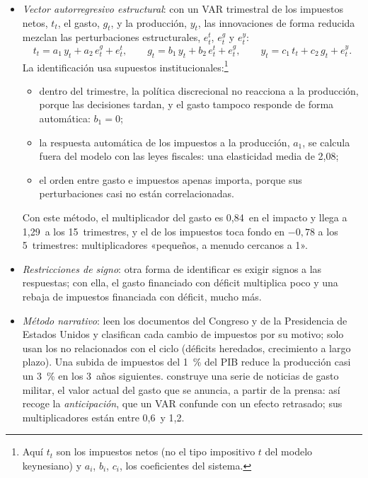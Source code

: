 \documentclass[11pt]{article}
\begin{document}
\begin{itemize}
\item \emph{Vector autorregresivo estructural}\nocite{BlanchardPerotti2002}: con un VAR trimestral de los impuestos netos, $t_t$, el gasto, $g_t$, y la producción, $y_t$, las innovaciones de forma reducida mezclan las perturbaciones estructurales, $e^t_t$, $e^g_t$ y $e^y_t$:
  \begin{equation*}
  t_t=a_1\,y_t+a_2\,e^g_t+e^t_t,\qquad g_t=b_1\,y_t+b_2\,e^t_t+e^g_t,\qquad y_t=c_1\,t_t+c_2\,g_t+e^y_t .
  \end{equation*}
  La identificación usa supuestos institucionales:\footnote{Aquí $t_t$ son los impuestos netos (no el tipo impositivo $t$ del modelo keynesiano) y $a_i$, $b_i$, $c_i$, los coeficientes del sistema.}
  \begin{itemize}
  \item dentro del trimestre, la política discrecional no reacciona a la producción, porque las decisiones tardan, y el gasto tampoco responde de forma automática: $b_1=0$;
  \item la respuesta automática de los impuestos a la producción, $a_1$, se calcula fuera del modelo con las leyes fiscales: una elasticidad media de 2,08;
  \item el orden entre gasto e impuestos apenas importa, porque sus perturbaciones casi no están correlacionadas.
  \end{itemize}
  Con este método, el multiplicador del gasto es 0,84~en el impacto y llega a 1,29~a los 15~trimestres, y el de los impuestos toca fondo en $-0{,}78$ a los 5~trimestres: multiplicadores «pequeños, a menudo cercanos a 1».
\item \emph{Restricciones de signo}: otra forma de identificar es exigir signos a las respuestas; con ella, el gasto financiado con déficit multiplica poco y una rebaja de impuestos financiada con déficit, mucho más\nocite{MountfordUhlig2009}.
\item \emph{Método narrativo}: \textcite{RomerRomer2010Tax} leen los documentos del Congreso y de la Presidencia de Estados Unidos y clasifican cada cambio de impuestos por su motivo; solo usan los no relacionados con el ciclo (déficits heredados, crecimiento a largo plazo). Una subida de impuestos del 1~\% del PIB reduce la producción casi un 3~\% en los 3~años siguientes. \textcite{Ramey2011Timing} construye una serie de noticias de gasto militar, el valor actual del gasto que se anuncia, a partir de la prensa: así recoge la \emph{anticipación}, que un VAR confunde con un efecto retrasado; sus multiplicadores están entre 0,6~y 1,2.

\end{itemize}
\end{document}
